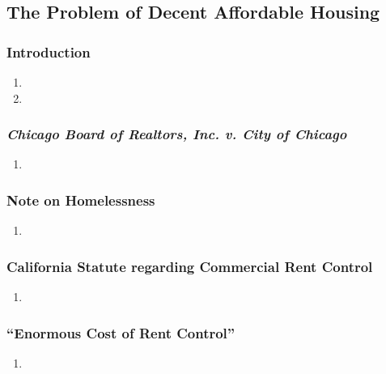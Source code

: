 \newpage %

\subsection{The Problem of Decent Affordable Housing}

\subsubsection{Introduction}

\begin{enumerate}
    \item %
    \item %
\end{enumerate}

\subsubsection{\emph{Chicago Board of Realtors, Inc. v. City of Chicago}}

\begin{enumerate}
    \item %
\end{enumerate}

\subsubsection{Note on Homelessness}

\begin{enumerate}
    \item %
\end{enumerate}

\subsubsection{California Statute regarding Commercial Rent Control}

\begin{enumerate}
    \item %
\end{enumerate}

\subsubsection{``Enormous Cost of Rent Control''}

\begin{enumerate}
    \item %
\end{enumerate}

